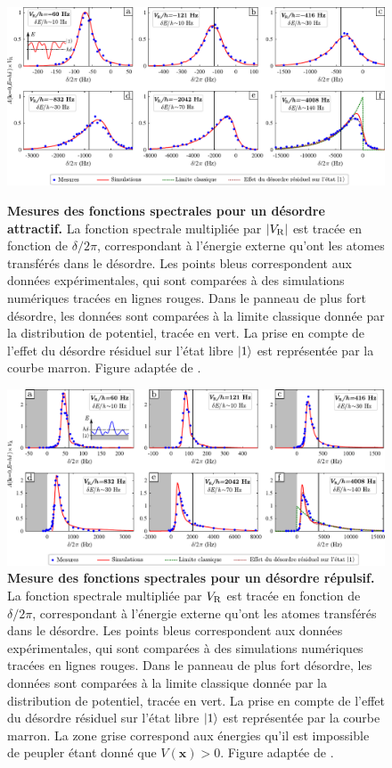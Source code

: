 \begin{figure}
\centering
\includegraphics[width=\textwidth]{Fig/TauS_NJP/fonctions_spectrales_rouge.pdf}
\caption{\textbf{Mesures des fonctions spectrales pour un désordre attractif.} La fonction spectrale multipliée par $|V_{\mathrm{R}}|$ est tracée en fonction de $\delta/2\pi$, correspondant à l'énergie externe qu'ont les atomes transférés dans le désordre. Les points bleus correspondent aux données expérimentales, qui sont comparées à des simulations numériques tracées en lignes rouges. Dans le panneau de plus fort désordre, les données sont comparées à la limite classique donnée par la distribution de potentiel, tracée en vert. La prise en compte de l'effet du désordre résiduel sur l'état libre $\left| 1 \right\rangle$ est représentée par la courbe marron. Figure adaptée de \citep{denechaud2018vers}.}
\label{fig:mesures_fonctions_spectrales_rouge}

\vspace{1cm}
\includegraphics[width=\textwidth]{Fig/TauS_NJP/fonctions_spectrales_bleu.pdf}
\caption{\textbf{Mesure des fonctions spectrales pour un désordre répulsif.} La fonction spectrale multipliée par $V_{\mathrm{R}}$ est tracée en fonction de $\delta/2\pi$, correspondant à l'énergie externe qu'ont les atomes transférés dans le désordre. Les points bleus correspondent aux données expérimentales, qui sont comparées à des simulations numériques tracées en lignes rouges. Dans le panneau de plus fort désordre, les données sont comparées à la limite classique donnée par la distribution de potentiel, tracée en vert. La prise en compte de l'effet du désordre résiduel sur l'état libre $\left| 1 \right\rangle$ est représentée par la courbe marron. La zone grise correspond aux énergies qu'il est impossible de peupler étant donné que $V(\mathbf{x})>0$. Figure adaptée de \citep{denechaud2018vers}.}
\label{fig:mesures_fonctions_spectrales_bleu}
\end{figure}

